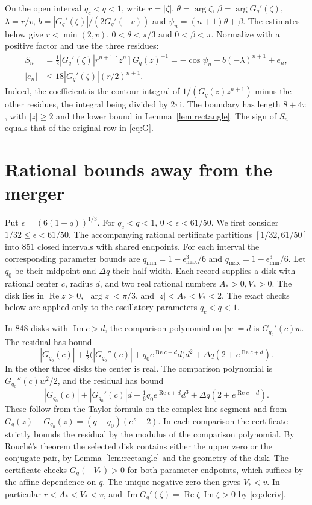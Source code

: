 \documentclass[11pt]{article}
\newcommand{\ii}{\mathrm{i}}
\newcommand{\Real}{\operatorname{Re}}
\newcommand{\Imag}{\operatorname{Im}}
\begin{document}
On the open interval \(q_c<q<1\), write \(r=|\zeta|\),
\(\theta=\arg\zeta\), \(\beta=\arg G_q'(\zeta)\),
\(\lambda=r/v\), \(b=|G_q'(\zeta)|/(2G_q'(-v))\) and
\(\psi_n=(n+1)\theta+\beta\). The estimates below give
\(r<\min(2,v)\), \(0<\theta<\pi/3\) and \(0<\beta<\pi\).
Normalize with a positive factor and use the three residues:
\begin{align}
 S_n&=\tfrac12 |G_q'(\zeta)|r^{n+1}[z^n]G_q(z)^{-1}
      =-\cos\psi_n-b(-\lambda)^{n+1}+e_n,\label{eq:res}\\
 |e_n|&\le18|G_q'(\zeta)|(r/2)^{n+1}.\label{eq:error}
\end{align}
Indeed, the coefficient is the contour integral of
\(1/(G_q(z)z^{n+1})\) minus the other residues,
the integral being divided by \(2\pi\ii\). The boundary has length
\(8+4\pi\), with \(|z|\ge2\) and the lower bound in
Lemma~\ref{lem:rectangle}. The sign of \(S_n\) equals that of the
original row in \eqref{eq:G}.

\section{Rational bounds away from the merger}

Put \(\epsilon=(6(1-q))^{1/3}\). For \(q_c<q<1\),
\(0<\epsilon<61/50\). We first consider \(1/32\le\epsilon<61/50\).
The accompanying rational certificate partitions \([1/32,61/50]\)
into 851 closed intervals with shared endpoints. For each interval
the corresponding parameter bounds are
\(q_{\min}=1-\epsilon_{\max}^3/6\) and
\(q_{\max}=1-\epsilon_{\min}^3/6\).
Let \(q_0\) be their midpoint and \(\Delta q\) their half-width.
Each record supplies a disk with rational center \(c\), radius \(d\),
and two real rational numbers \(A_*>0,V_*>0\). The disk lies in
\(\Real z>0\), \(|\arg z|<\pi/3\), and \(|z|<A_*<V_*<2\).
The exact checks below are applied only to the oscillatory parameters
\(q_c<q<1\).

In 848 disks with \(\Imag c>d\), the comparison polynomial on
\(|w|=d\) is \(G_{q_0}'(c)w\). The residual has bound
\[
 |G_{q_0}(c)|+
 \tfrac12\bigl(|G_{q_0}''(c)|+q_0 e^{\Real c+d}d\bigr)d^2
 +\Delta q(2+e^{\Real c+d}).
\]
In the other three disks the center is real. The comparison polynomial
is \(G_{q_0}''(c)w^2/2\), and the residual has bound
\[
 |G_{q_0}(c)|+|G_{q_0}'(c)|d+
 \tfrac16 q_0e^{\Real c+d}d^3
 +\Delta q(2+e^{\Real c+d}).
\]
These follow from the Taylor formula on the complex line segment
and from \(G_q(z)-G_{q_0}(z)=(q-q_0)(e^z-2)\).
In each comparison the certificate strictly bounds the residual by
the modulus of the comparison polynomial. By Rouch\'e's theorem
the selected disk contains either the upper zero or the conjugate
pair, by Lemma~\ref{lem:rectangle} and the geometry of the disk.
The certificate checks \(G_q(-V_*)>0\) for both parameter endpoints,
which suffices by the affine dependence on \(q\).
The unique negative zero then gives \(V_*<v\). In particular
\(r<A_*<V_*<v\), and \(\Imag G_q'(\zeta)=\Real\zeta\,\Imag\zeta>0\)
by \eqref{eq:deriv}.
\end{document}
